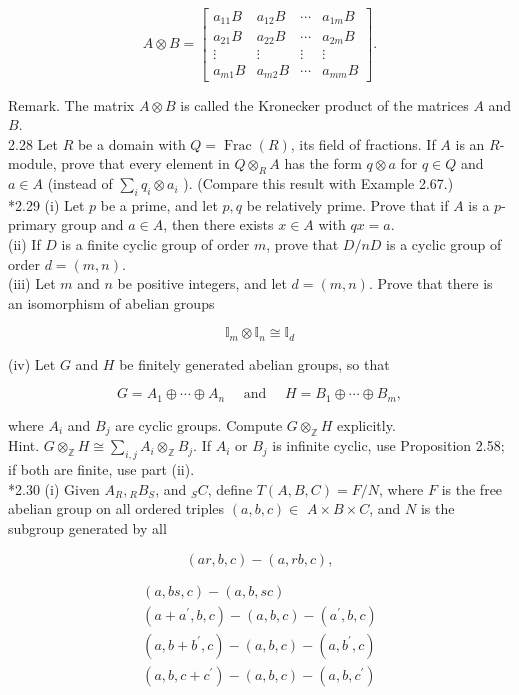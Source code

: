 \documentclass[10pt, letterpaper]{article}
\begin{document}
$$
A \otimes B=\left[\begin{array}{cccc}
a_{11} B & a_{12} B & \cdots & a_{1 m} B \\
a_{21} B & a_{22} B & \cdots & a_{2 m} B \\
\vdots & \vdots & \vdots & \vdots \\
a_{m 1} B & a_{m 2} B & \cdots & a_{m m} B
\end{array}\right] .
$$

Remark. The matrix $A \otimes B$ is called the Kronecker product of the matrices $A$ and $B$.\\
2.28 Let $R$ be a domain with $Q=\operatorname{Frac}(R)$, its field of fractions. If $A$ is an $R$-module, prove that every element in $Q \otimes_{R} A$ has the form $q \otimes a$ for $q \in Q$ and $a \in A$ (instead of $\sum_{i} q_{i} \otimes a_{i}$ ). (Compare this result with Example 2.67.)\\
*2.29 (i) Let $p$ be a prime, and let $p, q$ be relatively prime. Prove that if $A$ is a $p$-primary group and $a \in A$, then there exists $x \in A$ with $q x=a$.\\
(ii) If $D$ is a finite cyclic group of order $m$, prove that $D / n D$ is a cyclic group of order $d=(m, n)$.\\
(iii) Let $m$ and $n$ be positive integers, and let $d=(m, n)$. Prove that there is an isomorphism of abelian groups

$$
\mathbb{I}_{m} \otimes \mathbb{I}_{n} \cong \mathbb{I}_{d}
$$

(iv) Let $G$ and $H$ be finitely generated abelian groups, so that

$$
G=A_{1} \oplus \cdots \oplus A_{n} \quad \text { and } \quad H=B_{1} \oplus \cdots \oplus B_{m},
$$

where $A_{i}$ and $B_{j}$ are cyclic groups. Compute $G \otimes_{\mathbb{Z}} H$ explicitly.\\
Hint. $G \otimes_{\mathbb{Z}} H \cong \sum_{i, j} A_{i} \otimes_{\mathbb{Z}} B_{j}$. If $A_{i}$ or $B_{j}$ is infinite cyclic, use Proposition 2.58; if both are finite, use part (ii).\\
*2.30 (i) Given $A_{R},{ }_{R} B_{S}$, and ${ }_{S} C$, define $T(A, B, C)=F / N$, where $F$ is the free abelian group on all ordered triples $(a, b, c) \in$ $A \times B \times C$, and $N$ is the subgroup generated by all

$$
(a r, b, c)-(a, r b, c),
$$

$$
\begin{gathered}
(a, b s, c)-(a, b, s c) \\
\left(a+a^{\prime}, b, c\right)-(a, b, c)-\left(a^{\prime}, b, c\right) \\
\left(a, b+b^{\prime}, c\right)-(a, b, c)-\left(a, b^{\prime}, c\right) \\
\left(a, b, c+c^{\prime}\right)-(a, b, c)-\left(a, b, c^{\prime}\right)
\end{gathered}
$$
\end{document}
